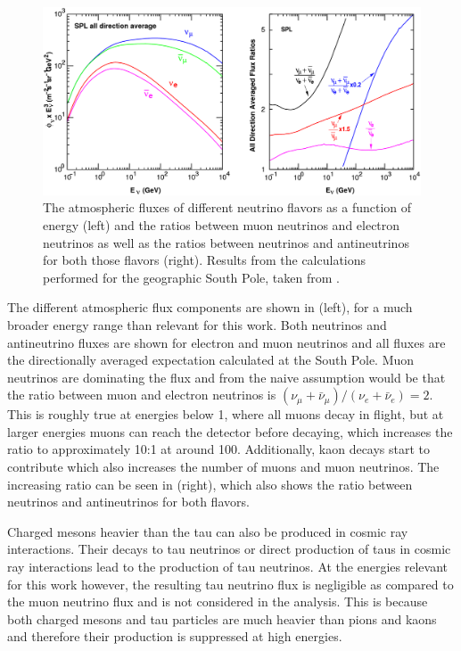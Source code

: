 \begin{figure}
    \centering
    \includegraphics[width=1.0\textwidth]{figures/neutrinos_properties/Honda_alldir-spl_copy.pdf}
    \caption[Atmospheric neutrino fluxes]{The atmospheric fluxes of different neutrino flavors as a function of energy (left) and the ratios between muon neutrinos and electron neutrinos as well as the ratios between neutrinos and antineutrinos for both those flavors (right). Results from the calculations performed for the geographic South Pole, taken from \cite{PhysRevD.92.023004_Honda_Flux}.}
\end{figure}

The different atmospheric flux components are shown in  (left), for a much broader energy range than relevant for this work. Both neutrinos and antineutrino fluxes are shown for electron  and muon neutrinos and all fluxes are the directionally averaged expectation calculated at the South Pole. Muon neutrinos are dominating the flux and from  the naive assumption would be that the ratio between muon and electron neutrinos is $(\nu_\mu+\bar{\nu}_\mu)/(\nu_e+\bar{\nu}_e)=2$. This is roughly true at energies below \SI{1}{\gev}, where all muons decay in flight, but at larger energies muons can reach the detector before decaying, which increases the ratio to approximately 10:1 at around \SI{100}{\gev}. Additionally, kaon decays start to contribute which also increases the number of muons and muon neutrinos. The increasing ratio can be seen in  (right), which also shows the ratio between neutrinos and antineutrinos for both flavors.

Charged mesons heavier than the tau can also be produced in cosmic ray interactions. Their decays to tau neutrinos or direct production of taus in cosmic ray interactions lead to the production of tau neutrinos. At the energies relevant for this work however, the resulting tau neutrino flux is negligible as compared to the muon neutrino flux  and is not considered in the analysis. This is because both charged mesons and tau particles are much heavier than pions and kaons and therefore their production is suppressed at high energies.



